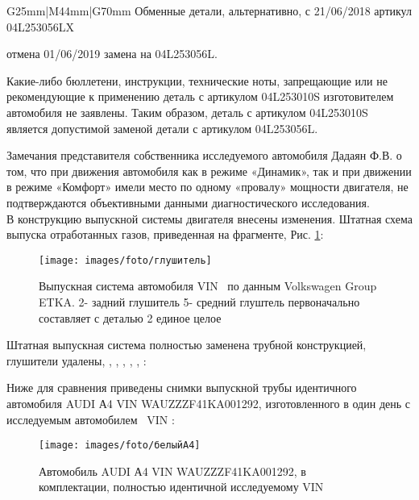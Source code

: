 \begin{longtable}{G{25mm}|M{44mm}|G{70mm}}
Обменные детали,   альтернативно, с 21/06/2018 артикул  04L253056LX 

отмена 01/06/2019  замена на  04L253056L. 

Какие-либо бюллетени, инструкции, технические ноты, запрещающие или не рекомендующие к применению деталь с артикулом 
04L253010S изготовителем автомобиля не заявлены. Таким образом,  деталь с артикулом 04L253010S  является допустимой заменой детали с артикулом 04L253056L.
 
 Замечания представителя собственника исследуемого автомобиля Дадаян Ф.В.  о том, что при движения автомобиля как в режиме «Динамик», так и при движении в режиме «Комфорт» имели место по одному «провалу» мощности двигателя,  не подтверждаются объективными  данными диагностического исследования.\\ 

 В конструкцию выпускной  системы двигателя внесены изменения. Штатная схема выпуска отработанных газов, приведенная на фрагменте, Рис. \ref{fig:gl}:
  \begin{figure}[H]
 	\centering
 	\texttt{[image: images/foto/глушитель]}
 	\caption{Выпускная система автомобиля VIN \vin \, по данным Volkswagen Group ETKA. 2- задний глушитель  5- средний глуштель первоначально составляет с деталью 2 единое целое}
 	\label{fig:gl}
 \end{figure}
 
Штатная выпускная система  полностью заменена трубной конструкцией, глушители удалены, , , , , , :\\
 

\vspace{5mm}

  Ниже для сравнения приведены снимки выпускной трубы  идентичного автомобиля AUDI А4 VIN WAUZZZF41KA001292,  изготовленного в один день с исследуемым автомобилем  \, VIN \vin: %
  
  
  \begin{figure}[H]
 	\centering
 	\texttt{[image: images/foto/белыйА4]}
 	\caption{Автомобиль AUDI А4 VIN WAUZZZF41KA001292, в комплектации, полностью идентичной исследуемому VIN \vin}
 	\label{fig:4}
 \end{figure}
 

\end{longtable}
